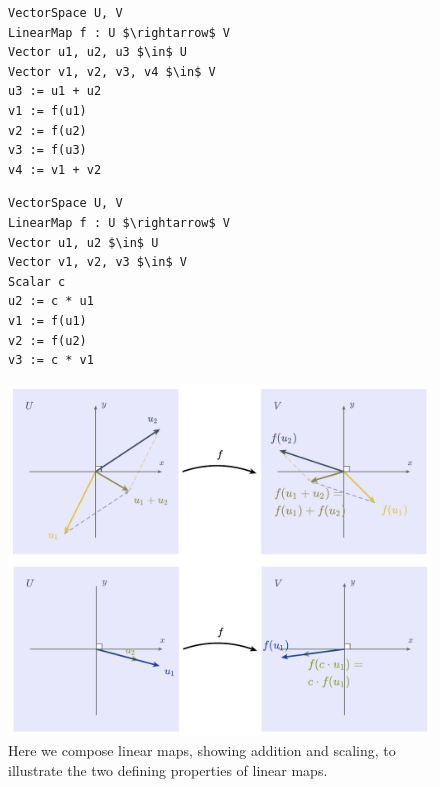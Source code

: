 \begin{figure}
  \begin{minipage}[t]{0.45\columnwidth}
   \begin{mdframed}[style=SUBCode]
    \begin{lstlisting}[language=Sub-LA,escapechar=@,numbers=none]
VectorSpace U, V
LinearMap f : U $\rightarrow$ V
Vector u1, u2, u3 $\in$ U
Vector v1, v2, v3, v4 $\in$ V
u3 := u1 + u2
v1 := f(u1)
v2 := f(u2)
v3 := f(u3)
v4 := v1 + v2
\end{lstlisting}
   \end{mdframed}
\end{minipage}\hfill
  \begin{minipage}[t]{0.45\columnwidth}
   \begin{mdframed}[style=SUBCode]
    \begin{lstlisting}[language=Sub-LA,escapechar=@,numbers=none]
VectorSpace U, V
LinearMap f : U $\rightarrow$ V
Vector u1, u2 $\in$ U
Vector v1, v2, v3 $\in$ V
Scalar c
u2 := c * u1
v1 := f(u1)
v2 := f(u2)
v3 := c * v1 \end{lstlisting}
   \end{mdframed}
  \end{minipage}
\includegraphics[width=\columnwidth]{assets/penrose/linearmap-add-scale.pdf}
   \caption{Here we compose linear maps, showing addition and scaling, to illustrate the two defining properties of linear maps.\label{fig:linearMap}}
\end{figure}


  
